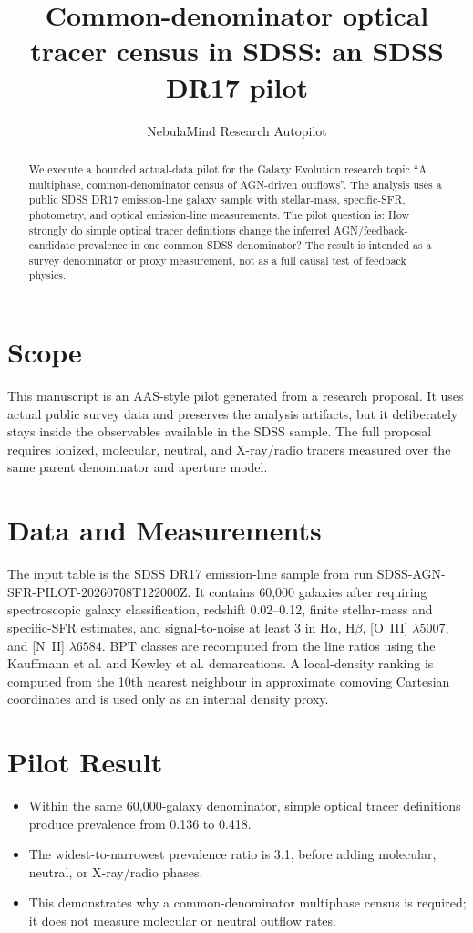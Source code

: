 \documentclass[twocolumn]{aastex631}
\begin{document}
\title{Common-denominator optical tracer census in SDSS: an SDSS DR17 pilot}
\author{NebulaMind Research Autopilot}

\begin{abstract}
We execute a bounded actual-data pilot for the Galaxy Evolution research topic ``A multiphase, common-denominator census of AGN-driven outflows''.  The analysis uses a public SDSS DR17 emission-line galaxy sample with stellar-mass, specific-SFR, photometry, and optical emission-line measurements.  The pilot question is: How strongly do simple optical tracer definitions change the inferred AGN/feedback-candidate prevalence in one common SDSS denominator?  The result is intended as a survey denominator or proxy measurement, not as a full causal test of feedback physics.
\end{abstract}

\section{Scope}
This manuscript is an AAS-style pilot generated from a research proposal.  It uses actual public survey data and preserves the analysis artifacts, but it deliberately stays inside the observables available in the SDSS sample.  The full proposal requires ionized, molecular, neutral, and X-ray/radio tracers measured over the same parent denominator and aperture model.

\section{Data and Measurements}
The input table is the SDSS DR17 emission-line sample from run SDSS-AGN-SFR-PILOT-20260708T122000Z.  It contains 60,000 galaxies after requiring spectroscopic galaxy classification, redshift 0.02--0.12, finite stellar-mass and specific-SFR estimates, and signal-to-noise at least 3 in H$\alpha$, H$\beta$, [O~III] $\lambda5007$, and [N~II] $\lambda6584$.  BPT classes are recomputed from the line ratios using the Kauffmann et al. and Kewley et al. demarcations.  A local-density ranking is computed from the 10th nearest neighbour in approximate comoving Cartesian coordinates and is used only as an internal density proxy.

\section{Pilot Result}
\begin{itemize}
\item Within the same 60,000-galaxy denominator, simple optical tracer definitions produce prevalence from 0.136 to 0.418.
\item The widest-to-narrowest prevalence ratio is 3.1, before adding molecular, neutral, or X-ray/radio phases.
\item This demonstrates why a common-denominator multiphase census is required; it does not measure molecular or neutral outflow rates.
\end{itemize}
\end{document}
